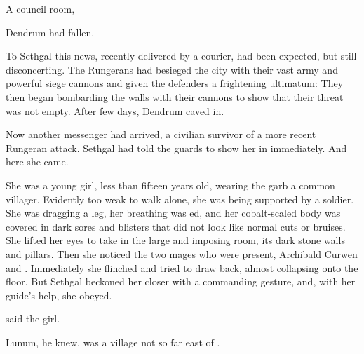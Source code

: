 





\begin{comment}
  \section{The Fall of Dendrum}
\end{comment}

\stamp
  {\dateBilaComesToForklin}
  {A council room, \Forclin}

Dendrum had fallen. 

To Sethgal this news, recently delivered by a courier, had been expected, but still disconcerting. 
The Rungerans had besieged the city with their vast army and powerful siege cannons and given the defenders a frightening ultimatum: 
They then began bombarding the walls with their cannons to show that their threat was not empty.
After few days, Dendrum caved in. 

Now another messenger had arrived, a civilian survivor of a more recent Rungeran attack. 
Sethgal had told the guards to show her in immediately. 
And here she came. 

She was a young \scathaese girl, less than fifteen years old, wearing the garb a common villager.
Evidently too weak to walk alone, she was being supported by a \scathaese soldier. 
She was dragging a leg, her breathing was \labour{}ed, and her cobalt-scaled body was covered in dark sores and blisters that did not look like normal cuts or bruises. 
She lifted her eyes to take in the large and imposing room, its dark stone walls and pillars. 
Then she noticed the two \human mages who were present, Archibald Curwen and \CarzainShireyo. 
Immediately she flinched and tried to draw back, almost collapsing onto the floor. 
But Sethgal beckoned her closer with a commanding gesture, and, with her guide's help, she obeyed. 


 said the girl.

Lunum, he knew, was a village not so far east of \Forclin. 

